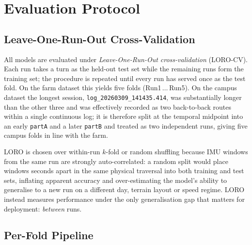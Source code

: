 \section{Evaluation Protocol}
\label{sec:eval_protocol}

\subsection{Leave-One-Run-Out Cross-Validation}

All models are evaluated under \emph{Leave-One-Run-Out cross-validation} (LORO-CV). Each run takes a turn as the held-out test set while the remaining runs form the training set; the procedure is repeated until every run has served once as the test fold. On the farm dataset this yields five folds (Run1\,$\ldots$\,Run5). On the campus dataset the longest session, \texttt{log\_20260309\_141435.414}, was substantially longer than the other three and was effectively recorded as two back-to-back routes within a single continuous log; it is therefore split at the temporal midpoint into an early \texttt{partA} and a later \texttt{partB} and treated as two independent runs, giving five campus folds in line with the farm.


LORO is chosen over within-run $k$-fold or random shuffling because IMU windows from the same run are strongly auto-correlated: a random split would place windows seconds apart in the same physical traversal into both training and test sets, inflating apparent accuracy and over-estimating the model's ability to generalise to a new run on a different day, terrain layout or speed regime. LORO instead measures performance under the only generalisation gap that matters for deployment: \emph{between} runs.

\subsection{Per-Fold Pipeline}
\label{sec:per_fold_pipeline}


